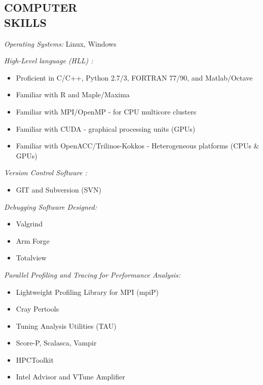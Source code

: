 \documentclass[margin]{res}
\begin{document}
\begin{resume}
                 
\section{COMPUTER \\ SKILLS}
{\sl Operating Systems:} Linux, Windows%

{\sl High-Level language (HLL) :} %
  \begin{itemize}  \itemsep -1pt 
      \item Proficient in C/C++, Python 2.7/3, FORTRAN 77/90, and Matlab/Octave 
      \item Familiar with R and Maple/Maxima
      \item Familiar with MPI/OpenMP - for CPU multicore clusters
      \item Familiar with CUDA - graphical processing units (GPUs)
      \item Familiar with OpenACC/Trilinos-Kokkos - Heterogeneous platforms (CPUs \& GPUs)     
    \end{itemize}

{\sl Version Control Software :} %
  \begin{itemize}  \itemsep -1pt 
      \item GIT and Subversion (SVN) 
    \end{itemize}    

{\sl Debugging Software Designed:}
  \begin{itemize}  \itemsep -1pt  
      \item Valgrind
      \item Arm Forge
      \item Totalview  
    \end{itemize}
    
{\sl Parallel Profiling and Tracing for Performance Analysis:}
  \begin{itemize}  \itemsep -1pt  
      \item Lightweight Profiling Library for MPI (mpiP)
      \item Cray Pertools
      \item Tuning Analysis Utilities (TAU)
      \item Score-P, Scalasca, Vampir
      \item HPCToolkit
      \item Intel Advisor and VTune Amplifier
    \end{itemize}
    

\end{resume}
\end{document}
